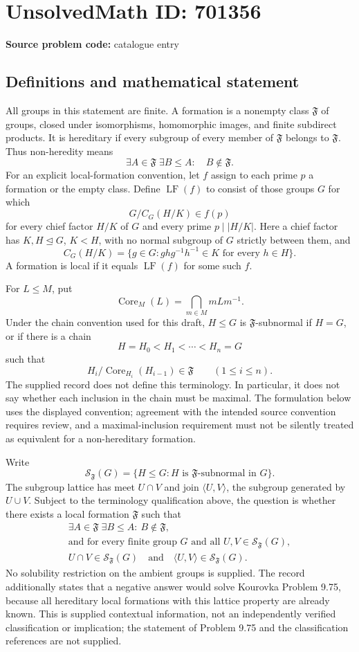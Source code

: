 \documentclass[11pt]{article}
\begin{document}
\section*{UnsolvedMath ID: 701356}
\textbf{Source problem code:} catalogue entry
\subsection{Definitions and mathematical statement}
All groups in this statement are finite. A formation is a nonempty class \(\mathfrak F\) of groups, closed under isomorphisms, homomorphic images, and finite subdirect products. It is hereditary if every subgroup of every member of \(\mathfrak F\) belongs to \(\mathfrak F\). Thus non-heredity means
\[
\exists A\in\mathfrak F\;\exists B\leq A:\quad B\notin\mathfrak F.
\]
For an explicit local-formation convention, let \(f\) assign to each prime \(p\) a formation or the empty class. Define \(\operatorname{LF}(f)\) to consist of those groups \(G\) for which
\[
G/C_G(H/K)\in f(p)
\]
for every chief factor \(H/K\) of \(G\) and every prime \(p\mid |H/K|\). Here a chief factor has \(K,H\trianglelefteq G\), \(K<H\), with no normal subgroup of \(G\) strictly between them, and
\[
C_G(H/K)=\{g\in G: ghg^{-1}h^{-1}\in K\text{ for every }h\in H\}.
\]
A formation is local if it equals \(\operatorname{LF}(f)\) for some such \(f\).

For \(L\leq M\), put
\[
\operatorname{Core}_M(L)=\bigcap_{m\in M}mLm^{-1}.
\]
Under the chain convention used for this draft, \(H\leq G\) is \(\mathfrak F\)-subnormal if \(H=G\), or if there is a chain
\[
H=H_0<H_1<\cdots<H_n=G
\]
such that
\[
H_i/\operatorname{Core}_{H_i}(H_{i-1})\in\mathfrak F
\qquad(1\leq i\leq n).
\]
The supplied record does not define this terminology. In particular, it does not say whether each inclusion in the chain must be maximal. The formulation below uses the displayed convention; agreement with the intended source convention requires review, and a maximal-inclusion requirement must not be silently treated as equivalent for a non-hereditary formation.

Write
\[
\mathcal S_{\mathfrak F}(G)=\{H\leq G:H\text{ is }\mathfrak F\text{-subnormal in }G\}.
\]
The subgroup lattice has meet \(U\cap V\) and join \(\langle U,V\rangle\), the subgroup generated by \(U\cup V\). Subject to the terminology qualification above, the question is whether there exists a local formation \(\mathfrak F\) such that
\[
\begin{gathered}
\exists A\in\mathfrak F\;\exists B\leq A:\ B\notin\mathfrak F,\\
\text{and for every finite group }G\text{ and all }U,V\in\mathcal S_{\mathfrak F}(G),\\
U\cap V\in\mathcal S_{\mathfrak F}(G)
\quad\text{and}\quad
\langle U,V\rangle\in\mathcal S_{\mathfrak F}(G).
\end{gathered}
\]
No solubility restriction on the ambient groups is supplied. The record additionally states that a negative answer would solve Kourovka Problem 9.75, because all hereditary local formations with this lattice property are already known. This is supplied contextual information, not an independently verified classification or implication; the statement of Problem 9.75 and the classification references are not supplied.
\end{document}
